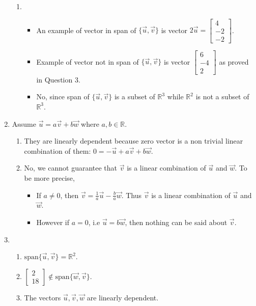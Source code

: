 \documentclass[letter]{article}
\newcommand{\mat}[1]{\begin{bmatrix}#1\end{bmatrix}}
\begin{document}
\begin{enumerate}
\begin{enumerate}
	            \item 
			\begin{itemize}
	                \item An example of vector in span of $\{\vec{u}, \vec{v} \}$ is vector $2 \vec{u} = \mat{4 \\ -2 \\ -2}$.
	                
	                \item Example of vector not in span of $\{ \vec{u}, \vec{v}\}$ is vector $\mat{6 \\ -4 \\ 2}$ as proved in Question 3. 
	                
	                \item No, since span of $\{\vec{u}, \vec{v}\} $ is a subset of $\mathbb{R}^3$ while $\mathbb R^2$ is not a subset of $\mathbb{R}^3$.
	            \end{itemize}
	       
	        \end{enumerate}
	        
	    \item Assume $\vec{u} = a \vec{v} + b \vec{w}$ where $a, b \in \mathbb{R}$.
	        \begin{enumerate}
	            \item They are linearly dependent because zero vector is a non trivial linear combination of them: $0 = -\vec{u} + a \vec{v} + b \vec{w}$.
	            
	            \item No, we cannot guarantee that $\vec{v}$ is a linear combination of $\vec{u}$ and $\vec{w}$. To be more precise,
	                \begin{itemize}
	                    \item If $a \neq 0$, then $\vec{v} = \frac{1}{a} \vec{u} - \frac{b}{a} \vec{w}$. Thus $\vec{v}$ is a linear combination of $\vec{u}$ and $\vec{w}$.
	                    
	                    \item However if $a = 0$, i.e $\vec{u} = b \vec{w}$, then nothing can be said about $\vec{v}$.
	                \end{itemize}
	                
	                
	        \end{enumerate}
	        
	    \item \begin{enumerate}
			    \item $\mathrm{span}\{ \vec{u}, \vec{v} \} = \mathbb{R}^2$.
	        
		\item $\mat{2 \\ 18} \not \in \mathrm{span} \{\vec{w}, \vec{v} \}$.
	        
	        \item The vectors $\vec u,\vec v,\vec w$ are linearly dependent. 
	    \end{enumerate}
	\end{enumerate}
	
\end{document}
